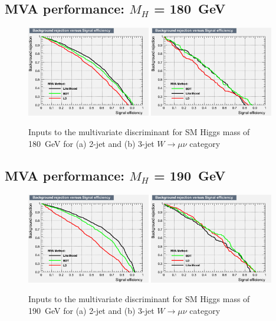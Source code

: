 \subsection{MVA performance: \texorpdfstring{$M_H$}{M(H)} = 180~GeV}
\begin{figure}[ht]
  \centering
  \includegraphics[width=0.48\textwidth]{figs/TMVA_180_nJ2_mu_rejBvsS}
  \includegraphics[width=0.48\textwidth]{figs/TMVA_180_nJ3_mu_rejBvsS}	
  \caption{\label{fig:perf180mu}Inputs to the multivariate discriminant for SM Higgs mass of 180~GeV for (a) 2-jet and (b) 3-jet $W\to\mu\nu$ category}
\end{figure}
\newpage
\subsection{MVA performance: \texorpdfstring{$M_H$}{M(H)} = 190~GeV}
\begin{figure}[ht]
  \centering
  \includegraphics[width=0.48\textwidth]{figs/TMVA_190_nJ2_mu_rejBvsS}
  \includegraphics[width=0.48\textwidth]{figs/TMVA_190_nJ3_mu_rejBvsS}	
  \caption{\label{fig:perf190mu}Inputs to the multivariate discriminant for SM Higgs mass of 190~GeV for (a) 2-jet and (b) 3-jet $W\to\mu\nu$ category}
\end{figure}
